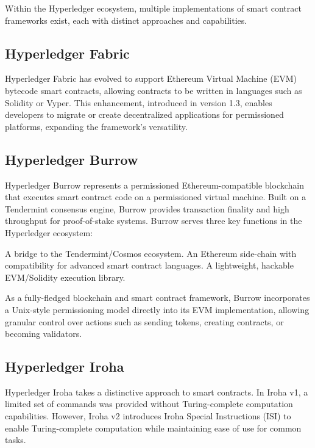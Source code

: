 \documentclass{article}
\begin{document}
Within the Hyperledger ecosystem, multiple implementations of smart contract frameworks exist, each with distinct approaches and capabilities.

\subsection{Hyperledger Fabric}

Hyperledger Fabric has evolved to support Ethereum Virtual Machine (EVM) bytecode smart contracts, allowing contracts to be written in languages such as Solidity or Vyper. This enhancement, introduced in version 1.3, enables developers to migrate or create decentralized applications for permissioned platforms, expanding the framework's versatility\cite{hyperledger2018fabric}.

\subsection{Hyperledger Burrow}

Hyperledger Burrow represents a permissioned Ethereum-compatible blockchain that executes smart contract code on a permissioned virtual machine. Built on a Tendermint consensus engine, Burrow provides transaction finality and high throughput for proof-of-stake systems. Burrow serves three key functions in the Hyperledger ecosystem:

A bridge to the Tendermint/Cosmos ecosystem. An Ethereum side-chain with compatibility for advanced smart contract languages. A lightweight, hackable EVM/Solidity execution library\cite{hyperledger2019burrow}.

As a fully-fledged blockchain and smart contract framework, Burrow incorporates a Unix-style permissioning model directly into its EVM implementation, allowing granular control over actions such as sending tokens, creating contracts, or becoming validators\cite{monax2020burrow}.

\subsection{Hyperledger Iroha}

Hyperledger Iroha takes a distinctive approach to smart contracts. In Iroha v1, a limited set of commands was provided without Turing-complete computation capabilities. However, Iroha v2 introduces Iroha Special Instructions (ISI) to enable Turing-complete computation while maintaining ease of use for common tasks.
\end{document}
